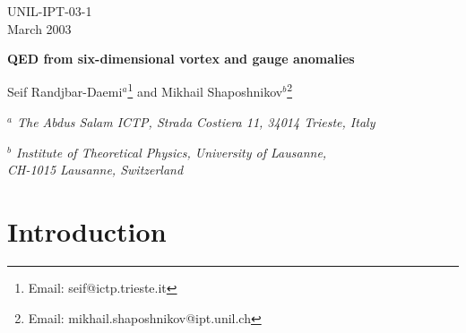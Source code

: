 \documentclass[a4paper,12pt]{article}
\begin{document}
\pagestyle{empty}
\begin{flushright}
UNIL-IPT-03-1\\ 
March 2003
\end{flushright}
\vspace*{5mm}

\begin{center}

{\Large\bf QED from six-dimensional vortex and gauge anomalies}

\vspace{1cm}

{\large Seif Randjbar-Daemi$^a$\footnote{Email: seif@ictp.trieste.it}
and Mikhail Shaposhnikov$^b$\footnote{Email:
mikhail.shaposhnikov@ipt.unil.ch}}\\

\vspace{.6cm}

{\it{$^a$ The Abdus Salam ICTP, Strada Costiera 11, 34014 Trieste,
Italy}}

{\it {$^b$ Institute of Theoretical Physics, University of Lausanne,\\ 
CH-1015 Lausanne, Switzerland}}
\vspace{.4cm}
\end{center}

\vspace{1cm}  

\begin{abstract}

Starting from an anomaly-free Abelian Higgs model coupled to gravity
in a 6-dimensional space-time we construct an effective
four-dimensional theory of charged fermions interacting with U(1)
Abelian gauge field and gravity, both localised near the core of a
Nielsen-Olesen vortex configuration. We show that an anomaly free
theory in 6-dimensions can give rise to an anomalous  theory in D=4,
which suggests a possibility of consistent regularisation of abelian
anomalous chiral gauge theories in four dimensions. We also show that
the spectrum of charged bulk fermions has a mass gap. 

\end{abstract}

\vfill

\eject
\pagestyle{empty}
\setcounter{page}{1}
\setcounter{footnote}{0}
\pagestyle{plain}

\section{Introduction}
\end{document}
